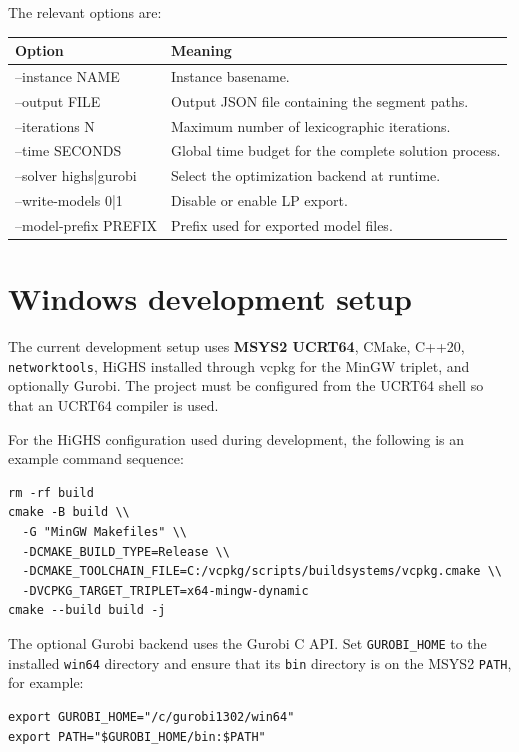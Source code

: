\documentclass[11pt,a4paper]{article}
\begin{document}
The relevant options are:
\begin{longtable}{>{\ttfamily}p{}p{}}
\toprule
\normalfont\textbf{Option} & \textbf{Meaning}\\
\midrule
--instance NAME & Instance basename.\\
--output FILE & Output JSON file containing the segment paths.\\
--iterations N & Maximum number of lexicographic iterations.\\
--time SECONDS & Global time budget for the complete solution process.\\
--solver highs|gurobi & Select the optimization backend at runtime.\\
--write-models 0|1 & Disable or enable LP export.\\
--model-prefix PREFIX & Prefix used for exported model files.\\
\bottomrule
\end{longtable}

\section{Windows development setup}

The current development setup uses \textbf{MSYS2 UCRT64}, CMake, C++20,
\texttt{networktools}, HiGHS installed through vcpkg for the MinGW triplet, and
optionally Gurobi. The project must be configured from the UCRT64 shell so that
an UCRT64 compiler is used.

For the HiGHS configuration used during development, the following is an
example command sequence:
\begin{lstlisting}
rm -rf build
cmake -B build \\
  -G "MinGW Makefiles" \\
  -DCMAKE_BUILD_TYPE=Release \\
  -DCMAKE_TOOLCHAIN_FILE=C:/vcpkg/scripts/buildsystems/vcpkg.cmake \\
  -DVCPKG_TARGET_TRIPLET=x64-mingw-dynamic
cmake --build build -j
\end{lstlisting}

The optional Gurobi backend uses the Gurobi C API. Set \texttt{GUROBI\_HOME} to
the installed \texttt{win64} directory and ensure that its \texttt{bin}
directory is on the MSYS2 \texttt{PATH}, for example:
\begin{lstlisting}
export GUROBI_HOME="/c/gurobi1302/win64"
export PATH="$GUROBI_HOME/bin:$PATH"
\end{lstlisting}
\end{document}
